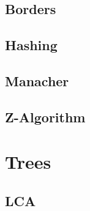 \subsection{Borders}
\raggedbottom
\hrulefill
\subsection{Hashing}
\raggedbottom
\hrulefill
\subsection{   Manacher}
\raggedbottom
\hrulefill
\subsection{Z-Algorithm}
\raggedbottom
\hrulefill

\section{Trees}
\subsection{LCA}
\raggedbottom
\hrulefill

